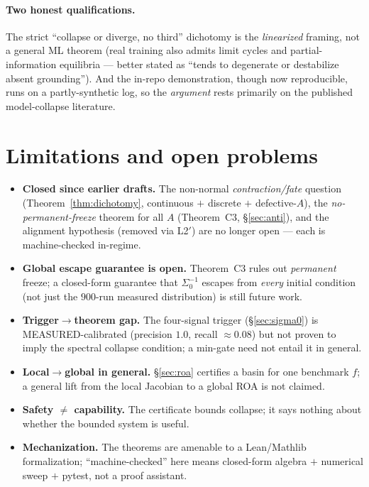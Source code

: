 \documentclass[11pt]{article}
\theoremstyle{definition}
\begin{document}
\paragraph{Two honest qualifications.} The strict ``collapse or diverge, no third'' dichotomy
is the \emph{linearized} framing, not a general ML theorem (real training also admits limit
cycles and partial-information equilibria --- better stated as ``tends to degenerate or
destabilize absent grounding''). And the in-repo demonstration, though now reproducible,
runs on a partly-synthetic log, so the \emph{argument} rests primarily on the published
model-collapse literature.

\section{Limitations and open problems}
\label{sec:limits}
\begin{itemize}[leftmargin=1.4em]
\item \textbf{Closed since earlier drafts.} The non-normal \emph{contraction/fate} question
(Theorem~\ref{thm:dichotomy}, continuous $+$ discrete $+$ defective-$A$), the
\emph{no-permanent-freeze} theorem for all $A$ (Theorem~C3, \S\ref{sec:anti}), and the
alignment hypothesis (removed via L2$'$) are no longer open --- each is machine-checked
in-regime.
\item \textbf{Global escape guarantee is open.} Theorem~C3 rules out \emph{permanent} freeze;
a closed-form guarantee that $\Sigma_0^{-1}$ escapes from \emph{every} initial condition
(not just the $900$-run measured distribution) is still future work.
\item \textbf{Trigger$\to$theorem gap.} The four-signal trigger (\S\ref{sec:sigma0}) is
MEASURED-calibrated (precision $1.0$, recall $\approx0.08$) but not proven to imply the
spectral collapse condition; a min-gate need not entail it in general.
\item \textbf{Local$\to$global in general.} \S\ref{sec:roa} certifies a basin for one
benchmark $f$; a general lift from the local Jacobian to a global ROA is not claimed.
\item \textbf{Safety $\ne$ capability.} The certificate bounds collapse; it says nothing
about whether the bounded system is useful.
\item \textbf{Mechanization.} The theorems are amenable to a Lean/Mathlib formalization;
``machine-checked'' here means closed-form algebra $+$ numerical sweep $+$ pytest, not a
proof assistant.
\end{itemize}
\end{document}
